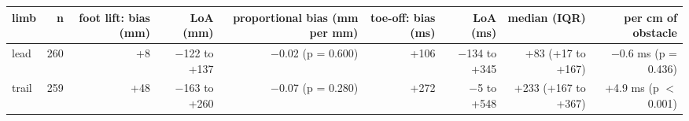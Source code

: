 \begin{adjustbox}{max width=\textwidth}
{\scriptsize
\begin{tabular}{lrrrrrrrr}
\toprule
\textbf{limb} & \textbf{n} & \textbf{foot lift: bias (mm)} & \textbf{LoA (mm)} & \textbf{proportional bias (mm per mm)} & \textbf{toe-off: bias (ms)} & \textbf{LoA (ms)} & \textbf{median (IQR)} & \textbf{per cm of obstacle} \\
\midrule
lead & 260 & +8 & $-$122 to +137 & $-$0.02 (p = 0.600) & +106 & $-$134 to +345 & +83 (+17 to +167) & $-$0.6 ms (p = 0.436) \\
trail & 259 & +48 & $-$163 to +260 & $-$0.07 (p = 0.280) & +272 & $-$5 to +548 & +233 (+167 to +367) & +4.9 ms (p $<$ 0.001) \\
\bottomrule
\end{tabular}
}
\end{adjustbox}
